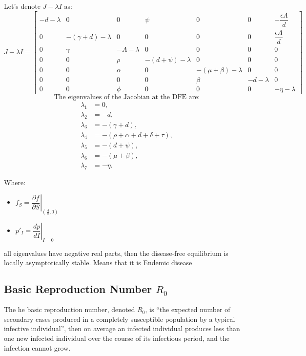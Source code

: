 \documentclass[a4paper,12pt]{report}
\begin{document}
\begin{itemize}
Let's denote \( J - \lambda I \) as:
\[
J - \lambda I =
\begin{bmatrix}
-d - \lambda & 0 & 0 & \psi & 0 & 0 & -\dfrac{\epsilon \Lambda}{d} \\
0 & -(\gamma + d) - \lambda & 0 & 0 & 0 & 0 & \dfrac{\epsilon \Lambda}{d} \\
0 & \gamma & -A - \lambda & 0 & 0 & 0 & 0 \\
0 & 0 & \rho & -(d + \psi) - \lambda & 0 & 0 & 0 \\
0 & 0 & \alpha & 0 & -(\mu + \beta) - \lambda & 0 & 0 \\
0 & 0 & 0 & 0 & \beta & -d - \lambda & 0 \\
0 & 0 & \phi & 0 & 0 & 0 & -\eta - \lambda
\end{bmatrix}
\]
\[
\text{The eigenvalues of the Jacobian at the DFE are:}
\]
\[
\begin{aligned}
\lambda_1 &= 0, \\
\lambda_2 &= -d, \\
\lambda_3 &= -(\gamma + d), \\
\lambda_4 &= -(\rho + \alpha + d + \delta + \tau), \\
\lambda_5 &= -(d + \psi), \\
\lambda_6 &= -(\mu + \beta), \\
\lambda_7 &= -\eta.
\end{aligned}
\]

Where:
\begin{itemize}
  \item \( f_S = \left. \dfrac{\partial f}{\partial S} \right|_{\left(\frac{\Lambda}{d}, 0\right)} \)
  \item \( p'_I = \left. \dfrac{dp}{dI} \right|_{I=0} \)
\end{itemize}

 all eigenvalues have negative real parts, then the disease-free equilibrium is locally asymptotically stable. Means that it is Endemic disease

























\subsection{ Basic Reproduction Number $R_0$}
The he basic reproduction number, denoted \(R_0\), is “the expected number of secondary cases produced in a completely susceptible population by a typical infective individual”, then on
 average an infected individual produces less than one new infected individual over the course of its infectious period, and the infection cannot grow.


\end{itemize}
\end{document}
